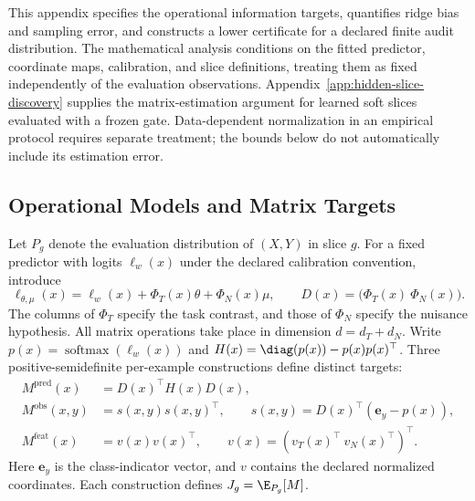 This appendix specifies the operational information targets, quantifies ridge bias and sampling error, and constructs a lower certificate for a declared finite audit distribution. The mathematical analysis conditions on the fitted predictor, coordinate maps, calibration, and slice definitions, treating them as fixed independently of the evaluation observations. Appendix~\ref{app:hidden-slice-discovery} supplies the matrix-estimation argument for learned soft slices evaluated with a frozen gate. Data-dependent normalization in an empirical protocol requires separate treatment; the bounds below do not automatically include its estimation error.

\subsection{Operational Models and Matrix Targets}
\label{app:operational-matrices}

Let $P_g$ denote the evaluation distribution of $(X,Y)$ in slice $g$. For a fixed predictor with logits $\ell_w(x)$ under the declared calibration convention, introduce
\begin{equation}
\ell_{\theta,\mu}(x)=\ell_w(x)+\Phi_T(x)\theta+\Phi_N(x)\mu,
\qquad D(x)=\bigl(\Phi_T(x)\ \Phi_N(x)\bigr).
\label{eq:operational-perturbations}
\end{equation}
The columns of $\Phi_T$ specify the task contrast, and those of $\Phi_N$ specify the nuisance hypothesis. All matrix operations take place in dimension $d=d_T+d_N$. Write $p(x)=\operatorname{softmax}(\ell_w(x))$ and $H(x)=\diag(p(x))-p(x)p(x)^\top$. Three positive-semidefinite per-example constructions define distinct targets:
\begin{equation}
\begin{aligned}
M^{\mathrm{pred}}(x)&=D(x)^\top H(x)D(x),\\
M^{\mathrm{obs}}(x,y)&=s(x,y)s(x,y)^\top,
\qquad s(x,y)=D(x)^\top(\mathbf e_y-p(x)),\\
M^{\mathrm{feat}}(x)&=v(x)v(x)^\top,
\qquad v(x)=(v_T(x)^\top\ v_N(x)^\top)^\top.
\end{aligned}
\label{eq:appB-matrix-targets}
\end{equation}
Here $\mathbf e_y$ is the class-indicator vector, and $v$ contains the declared normalized coordinates. Each construction defines $J_g=\E_{P_g}[M]$.


